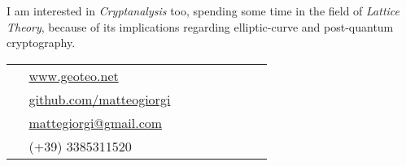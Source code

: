 \documentclass[10pt]{article} %
\begin{document}
\begin{paracol}{2}
\medskip
I am interested in \textit{Cryptanalysis} too, spending some time in the field of \textit{Lattice Theory}, because of its implications regarding elliptic-curve and post-quantum cryptography.





\switchcolumn %


\parbox[top][0.12\textheight][c]{\linewidth}{ %
	\vspace{-0.04\textheight} %
	\colorbox{shade}{ %
		\begin{supertabular}{p{0.05\linewidth}|p{0.775\linewidth}} %
			\raisebox{-1pt}{\faGlobe} & \href{https://www.geoteo.net}{www.geoteo.net} \\ %
            \raisebox{-1pt}{\faGithub} & \href{https://github.com/matteogiorgi}{github.com/matteogiorgi} \\ %
			\raisebox{-1pt}{\faEnvelopeSquare} & \href{mailto:mattegiorgi@gmail.com}{mattegiorgi@gmail.com} \\ %
			\raisebox{-1pt}{\faPhoneSquare} & (+39) 3385311520 \\ %
		\end{supertabular}
	}
}



\end{paracol}
\end{document}

